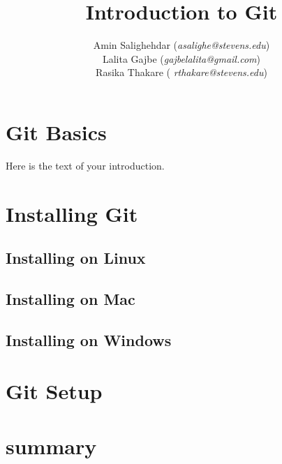 \documentclass[a4paper,10pt]{article}
\begin{document}
\title{\textbf{Introduction to Git}}
\author{Amin Salighehdar (\textit{asalighe@stevens.edu})\\Lalita Gajbe (\textit{gajbelalita@gmail.com})\\ Rasika Thakare ( \textit{rthakare@stevens.edu}) }
\date{}
\maketitle

\section{Git Basics}
Here is the text of your introduction.

\section{Installing Git}
\subsection{Installing on Linux}
\subsection{Installing on Mac}
\subsection{Installing on Windows}
\section{Git Setup}
\section{summary}


\end{document}
